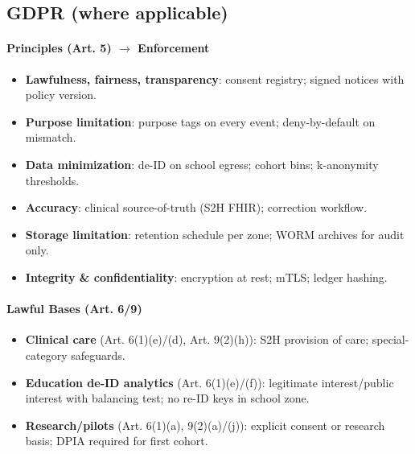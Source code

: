 \documentclass[11pt]{article}
\theoremstyle{plain}
\begin{document}
\subsection{GDPR (where applicable)}
\paragraph{Principles (Art. 5) $\rightarrow$ Enforcement}
\begin{itemize}
  \item \textbf{Lawfulness, fairness, transparency}: consent registry; signed notices with policy version.
  \item \textbf{Purpose limitation}: purpose tags on every event; deny-by-default on mismatch.
  \item \textbf{Data minimization}: de-ID on school egress; cohort bins; k-anonymity thresholds.
  \item \textbf{Accuracy}: clinical source-of-truth (S2H FHIR); correction workflow.
  \item \textbf{Storage limitation}: retention schedule per zone; WORM archives for audit only.
  \item \textbf{Integrity \& confidentiality}: encryption at rest; mTLS; ledger hashing.
\end{itemize}

\paragraph{Lawful Bases (Art. 6/9)}
\begin{itemize}
  \item \textbf{Clinical care} (Art. 6(1)(e)/(d), Art. 9(2)(h)): S2H provision of care; special-category safeguards.
  \item \textbf{Education de-ID analytics} (Art. 6(1)(e)/(f)): legitimate interest/public interest with balancing test; no re-ID keys in school zone.
  \item \textbf{Research/pilots} (Art. 6(1)(a), 9(2)(a)/(j)): explicit consent or research basis; DPIA required for first cohort.
\end{itemize}
\end{document}
